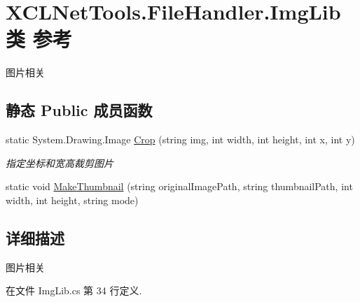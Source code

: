 \hypertarget{class_x_c_l_net_tools_1_1_file_handler_1_1_img_lib}{\section{X\-C\-L\-Net\-Tools.\-File\-Handler.\-Img\-Lib类 参考}
\label{class_x_c_l_net_tools_1_1_file_handler_1_1_img_lib}
}


图片相关  


\subsection*{静态 Public 成员函数}
\begin{DoxyCompactItemize}
\item 
static System.\-Drawing.\-Image \hyperlink{class_x_c_l_net_tools_1_1_file_handler_1_1_img_lib_ad00cc641f4f1585d61ce6c86962a6213}{Crop} (string img, int width, int height, int x, int y)
\begin{DoxyCompactList}\small\item\em 指定坐标和宽高裁剪图片 \end{DoxyCompactList}\item 
static void \hyperlink{class_x_c_l_net_tools_1_1_file_handler_1_1_img_lib_ac534eab24f71c848fb532ce77af53edc}{Make\-Thumbnail} (string original\-Image\-Path, string thumbnail\-Path, int width, int height, string mode)
\end{DoxyCompactItemize}


\subsection{详细描述}
图片相关 



在文件 Img\-Lib.\-cs 第 34 行定义.



